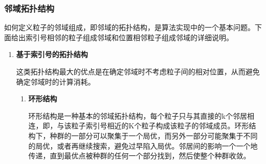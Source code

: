 \subsubsection{邻域拓扑结构}
如何定义粒子的邻域组成，即邻域的拓扑结构，是算法实现中的一个基本问题\cite{Peer2003Using}。下面给出索引号相邻的粒子组成邻域和位置相邻粒子组成邻域的详细说明。
\begin{enumerate}
	\item \textbf{基于索引号的拓扑结构}
	
	\hspace{2em}这类拓扑结构最大的优点是在确定邻域时不考虑粒子间的相对位置，从而避免确定邻域时的计算消耗。
	
	\begin{enumerate}
		\item \textbf{环形结构}
		
		\hspace{2em}环形结构是一种基本的邻域拓扑结构，每个粒子只与其直接的k个邻居相连，即，与该粒子索引号相近的K个粒子构成该粒子的邻域成员。环形结构下，种群的一部分可以聚集于一个局优，而另外一部分可能聚集于不同的局优，或者再继续搜索，避免过早陷入局优。邻居间的影响一个一个地传递，直到最优点被种群的任何一个部分找到，然后使整个种群收敛。
	

\end{enumerate}
\end{enumerate}
